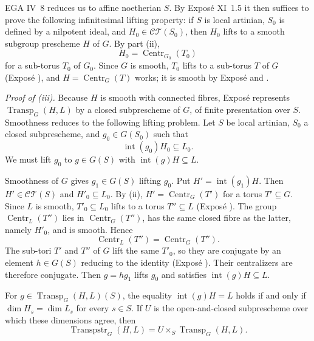 EGA IV~8 reduces us to affine noetherian \(S\). By Exposé XI~1.5 it
then suffices to prove the following infinitesimal lifting property:
if \(S\) is local artinian, \(S_0\) is defined by a nilpotent ideal,
and \(H_0\in\mathcal{CT}(S_0)\), then \(H_0\) lifts to a smooth
subgroup prescheme \(H\) of \(G\). By part (ii),
\[
 H_0=\operatorname{Centr}_{G_0}(T_0)
\]
for a sub-torus \(T_0\) of \(G_0\). Since \(G\) is smooth, \(T_0\)
lifts to a sub-torus \(T\) of \(G\) (Exposé ), and
\(H=\operatorname{Centr}_G(T)\) works; it is smooth by Exposé 
and .

\medskip\noindent\textit{Proof of (iii).}
Because \(H\) is smooth with connected fibres, Exposé 
represents \(\operatorname{Transp}_G(H,L)\) by a closed subprescheme
of \(G\), of finite presentation over \(S\). Smoothness reduces to
the following lifting problem. Let \(S\) be local artinian, \(S_0\)
a closed subprescheme, and \(g_0\in G(S_0)\) such that
\[
  \operatorname{int}(g_0)H_0\subseteq L_0.
\]
We must lift \(g_0\) to \(g\in G(S)\) with
\(\operatorname{int}(g)H\subseteq L\).

Smoothness of \(G\) gives \(g_1\in G(S)\) lifting \(g_0\). Put
\(H'=\operatorname{int}(g_1)H\). Then
\(H'\in\mathcal{CT}(S)\) and \(H'_0\subseteq L_0\). By (ii),
\(H'=\operatorname{Centr}_G(T')\) for a torus \(T'\subseteq G\).
Since \(L\) is smooth, \(T'_0\subseteq L_0\) lifts to a torus
\(T''\subseteq L\) (Exposé ). The group
\(\operatorname{Centr}_L(T'')\) lies in
\(\operatorname{Centr}_G(T'')\), has the same closed fibre as the
latter, namely \(H'_0\), and is smooth. Hence
\[
 \operatorname{Centr}_L(T'')
 =\operatorname{Centr}_G(T'').
\]
The sub-tori \(T'\) and \(T''\) of \(G\) lift the same \(T'_0\), so
they are conjugate by an element \(h\in G(S)\) reducing to the
identity (Exposé ). Their centralizers are therefore
conjugate. Then \(g=hg_1\) lifts \(g_0\) and satisfies
\(\operatorname{int}(g)H\subseteq L\).

For \(g\in\operatorname{Transp}_G(H,L)(S)\), the equality
\(\operatorname{int}(g)H=L\) holds if and only if
\(\dim H_s=\dim L_s\) for every \(s\in S\). If \(U\) is the
open-and-closed subprescheme over which these dimensions agree, then
\[
 \operatorname{Transpstr}_G(H,L)
 =U\times_S\operatorname{Transp}_G(H,L).
\]

